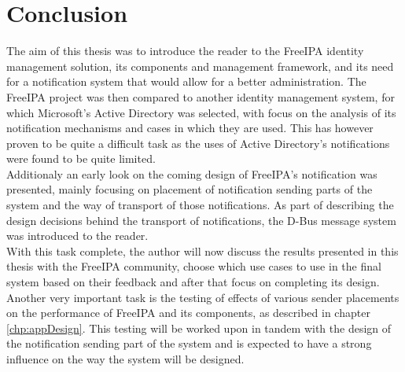 \chapter{Conclusion}
The aim of this thesis was to introduce the reader to the FreeIPA identity management solution, its components and management framework, and its need for a notification system that would allow for a better administration.
The FreeIPA project was then compared to another identity management system, for which Microsoft's Active Directory was selected, with focus on the analysis of its notification mechanisms and cases in which they are used.
This has however proven to be quite a difficult task as the uses of Active Directory's notifications were found to be quite limited.\\
Additionaly an early look on the coming design of FreeIPA's notification was presented, mainly focusing on placement of notification sending parts of the system and the way of transport of those notifications.
As part of describing the design decisions behind the transport of notifications, the D-Bus message system was introduced to the reader.\\
With this task complete, the author will now discuss the results presented in this thesis with the FreeIPA community, choose which use cases to use in the final system based on their feedback and after that focus on completing its design.\\
Another very important task is the testing of effects of various sender placements on the performance of FreeIPA and its components, as described in chapter \ref{chp:appDesign}.
This testing will be worked upon in tandem with the design of the notification sending part of the system and is expected to have a strong influence on the way the system will be designed.

